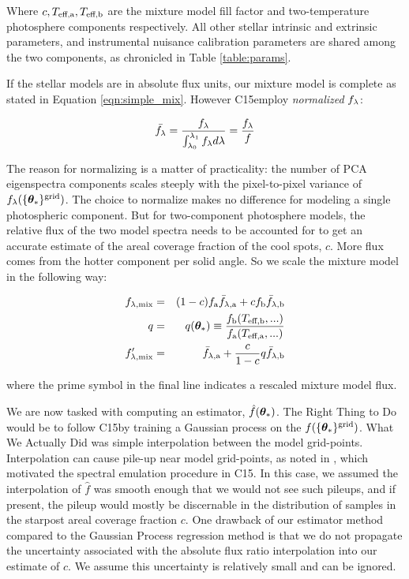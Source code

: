 \documentclass[onecolumn]{emulateapj}%
\newcommand{\iancze}{{\sc C15}}
\begin{document}
Where $c, T_\textrm{eff,a}, T_\textrm{eff,b}$ are the mixture model fill factor and two-temperature photosphere components respectively.  All other stellar intrinsic and extrinsic parameters, and instrumental nuisance calibration parameters are shared among the two components, as chronicled in Table \ref{table:params}.

If the stellar models are in absolute flux units, our mixture model is complete as stated in Equation \ref{eqn:simple_mix}.  However \iancze employ \emph{normalized} $f_\lambda$:


\begin{eqnarray} \label{eqn:normalization}
\bar {f_\lambda} = \frac{f_\lambda}{\int_{\lambda_0}^{\lambda_1} f_\lambda d\lambda} = \frac{f_\lambda}{f}
\end{eqnarray}

The reason for normalizing is a matter of practicality: the number of PCA eigenspectra components scales steeply with the pixel-to-pixel variance of $f_{\lambda}(\{{\bm \theta}_{\ast}\}^\textrm{grid})$.  The choice to normalize makes no difference for modeling a single photospheric component.  But for two-component photosphere models, the relative flux of the two model spectra needs to be accounted for to get an accurate estimate of the areal coverage fraction of the cool spots, $c$.  More flux comes from the hotter component per solid angle.  So we scale the mixture model in the following way:

\begin{eqnarray} \label{eqn:norm_scaling}
f_{\lambda, \mathrm{mix}} &=& (1-c) f_{\mathrm{a}}\bar f_{\lambda, \mathrm{a}} + c f_{\mathrm{b}} \bar f_{\lambda, \mathrm{b}} \\
q &=& q({\bm \theta}_{\ast})\equiv \frac{f_{\mathrm{b}}(T_\textrm{eff,b}, ...)}{f_{\mathrm{a}}(T_\textrm{eff,a}, ...)} \\
f_{\lambda, \mathrm{mix}}^{\prime} &=& \bar f_{\lambda, \mathrm{a}} + \frac{c}{1-c} q \bar f_{\lambda, \mathrm{b}} 
\end{eqnarray}

where the prime symbol in the final line indicates a rescaled mixture model flux.  

We are now tasked with computing an estimator, $\hat f({\bm \theta}_{\ast})$.  The Right Thing to Do would be to follow \iancze by training a Gaussian process on the $f(\{{\bm \theta}_{\ast}\}^\textrm{grid})$.  What We Actually Did was simple interpolation between the model grid-points.  Interpolation can cause pile-up near model grid-points, as noted in \citet{2014ApJ...794..125C}, which motivated the spectral emulation procedure in \iancze.  In this case, we assumed the interpolation of $\hat f$ was smooth enough that we would not see such pileups, and if present, the pileup would mostly be discernable in the distribution of samples in the starpost areal coverage fraction $c$.  One drawback of our estimator method compared to the Gaussian Process regression method is that we do not propagate the uncertainty associated with the absolute flux ratio interpolation into our estimate of $c$.  We assume this uncertainty is relatively small and can be ignored.
\end{document}
